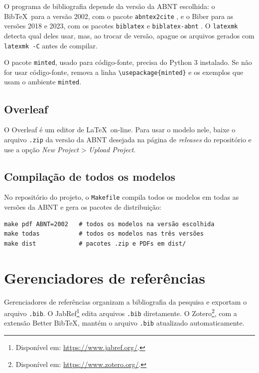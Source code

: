 \documentclass[
	12pt, %
	openright, %
	oneside, %
	a4paper, %
	sumario=tradicional, %
	english, %
	brazil, %
]{abntex2}
\begin{document}
O programa de bibliografia depende da versão da ABNT escolhida: o Bib\TeX\ para a versão 2002, com o pacote \texttt{abntex2cite} \cite{abntex2cite}, e o Biber para as versões 2018 e 2023, com os pacotes \texttt{biblatex} \cite{biblatex} e \texttt{biblatex-abnt} \cite{biblatexabnt}. O \texttt{latexmk} detecta qual deles usar, mas, ao trocar de versão, apague os arquivos gerados com \texttt{latexmk -C} antes de compilar.

O pacote \texttt{minted}, usado para código-fonte, precisa do Python 3 instalado. Se não for usar código-fonte, remova a linha \verb|\usepackage{minted}| e os exemplos que usam o ambiente \texttt{minted}.

\subsection{Overleaf}

O Overleaf é um editor de \LaTeX\ on-line. Para usar o modelo nele, baixe o arquivo \texttt{.zip} da versão da ABNT desejada na página de \textit{releases} do repositório e use a opção \textit{New Project} > \textit{Upload Project}.

\subsection{Compilação de todos os modelos}

No repositório do projeto, o \texttt{Makefile} compila todos os modelos em todas as versões da ABNT e gera os pacotes de distribuição:

\begin{verbatim}
make pdf ABNT=2002   # todos os modelos na versão escolhida
make todas           # todos os modelos nas três versões
make dist            # pacotes .zip e PDFs em dist/
\end{verbatim}

\section{Gerenciadores de referências}\label{sec:gerenciadores}

Gerenciadores de referências organizam a bibliografia da pesquisa e exportam o arquivo \texttt{.bib}. O JabRef\footnote{Disponível em: \url{https://www.jabref.org/}.} edita arquivos \texttt{.bib} diretamente. O Zotero\footnote{Disponível em: \url{https://www.zotero.org/}.}, com a extensão Better Bib\TeX, mantém o arquivo \texttt{.bib} atualizado automaticamente.
\end{document}
